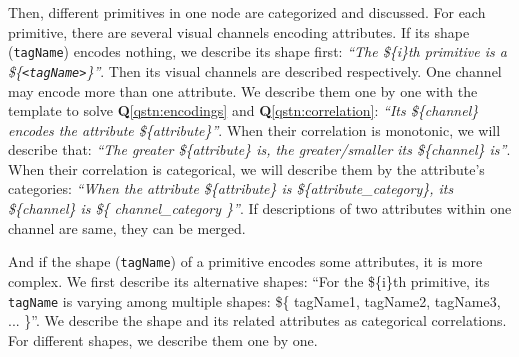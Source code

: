 Then, different primitives in one node are categorized and discussed. 
For each primitive, there are several visual channels encoding attributes.
If its shape (\texttt{tagName}) encodes nothing, we describe its shape first: \textit{``The \$\{i\}th primitive is a \$\{\texttt{<tagName>}\}''}.
Then its visual channels are described respectively.
One channel may encode more than one attribute.
We describe them one by one with the template to solve \textbf{Q}\ref{qstn:encodings} and \textbf{Q}\ref{qstn:correlation}:
\textit{``Its \$\{channel\} encodes the attribute \$\{attribute\}''}.
When their correlation is monotonic, we will describe that:
\textit{``The greater \$\{attribute\} is, the greater/smaller its \$\{channel\} is''}.
When their correlation is categorical, we will describe them by the attribute's categories:
\textit{``When the attribute \$\{attribute\} is \$\{attribute\_category\}, its \$\{channel\} is \$\{ channel\_category \}''}.
If descriptions of two attributes within one channel are same, they can be merged.

And if the shape (\texttt{tagName}) of a primitive encodes some attributes, it is more complex.
We first describe its alternative shapes: 
``For the \$\{i\}th primitive, its \texttt{tagName} is varying among multiple shapes: \$\{ tagName1, tagName2, tagName3, ... \}''.
We describe the shape and its related attributes as categorical correlations.
For different shapes, we describe them one by one.


